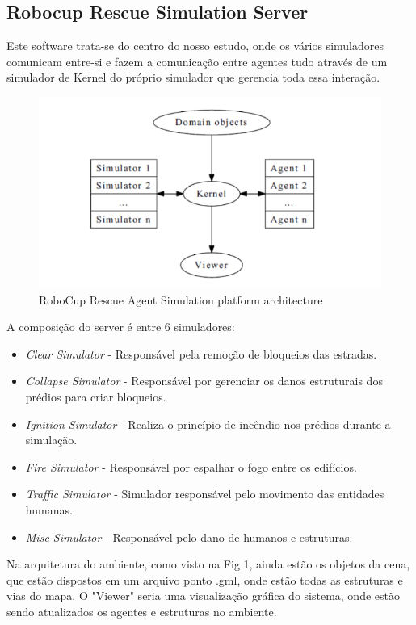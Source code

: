 \documentclass[conference]{IEEEtran}
\begin{document}
\subsection{Robocup Rescue Simulation Server}

Este software trata-se do centro do nosso estudo, onde os vários simuladores comunicam entre-si e fazem a comunicação entre agentes tudo através de um simulador de Kernel do próprio simulador que gerencia toda essa interação.

\begin{figure}[htbp]
\centerline{\includegraphics[scale=0.3]{fig1.png}}
\caption{RoboCup Rescue Agent Simulation platform architecture \cite{b1}}
\label{fig}
\end{figure}

A composição do server é entre 6 simuladores:
\begin{itemize}
\item \textit {Clear Simulator} - Responsável pela remoção de bloqueios das estradas. 
\item \textit {Collapse Simulator} - Responsável por gerenciar os danos estruturais dos prédios para criar bloqueios.
\item \textit {Ignition Simulator} - Realiza o princípio de incêndio nos prédios durante a simulação.
\item \textit {Fire Simulator} - Responsável por espalhar o fogo entre os edifícios.
\item \textit {Traffic Simulator} - Simulador responsável pelo movimento das entidades humanas.
\item \textit {Misc Simulator} - Responsável pelo dano de humanos e estruturas.
\end{itemize}

Na arquitetura do ambiente, como visto na Fig 1, ainda estão os objetos da cena, que estão dispostos em um arquivo ponto .gml, onde estão todas as estruturas e vias do mapa. O "Viewer" seria uma visualização gráfica do sistema, onde estão sendo atualizados os agentes e estruturas no ambiente. 
\end{document}
